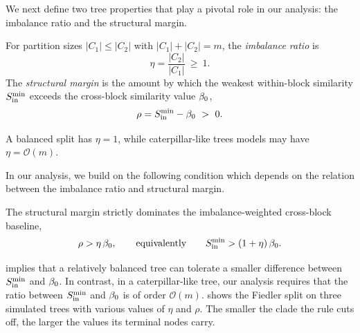 We next define two tree properties that play a pivotal role in our analysis: the imbalance ratio and the structural margin.

\begin{definition}\label{def:imbalance}
For partition sizes $|C_1| \le |C_2|$ with $|C_1|+|C_2|=m$, the \emph{imbalance ratio} is
\begin{equation}\label{eq:imbalance_ratio}
   \eta=\frac{|C_2|}{|C_1|}\ \ge\ 1 .
\end{equation}
The \emph{structural margin} is the
amount by which the weakest within-block similarity $S_{\mathrm{in}}^{\min}$ exceeds the cross-block similarity value $\beta_0$,
\begin{equation}\label{eq:margin_definition}
   \rho = S_{\mathrm{in}}^{\min}-\beta_0 \ >\ 0 .
\end{equation}
\end{definition}

\noindent A balanced split has $\eta=1$, while caterpillar-like trees models may have
$\eta=\mathcal{O}(m)$. 

In our analysis, 
we build on the following condition which depends on the relation between the imbalance ratio and structural margin.

\begin{condition}\label{asm:margin}
The structural margin strictly dominates the imbalance-weighted cross-block baseline,
\begin{equation}\label{eq:margin_assumption}
   \rho>\eta\,\beta_0,\qquad\text{equivalently}\qquad
   S_{\mathrm{in}}^{\min}>(1+\eta)\,\beta_0 .
\end{equation}
\end{condition}

 implies that a relatively balanced tree can tolerate a smaller difference between $S_{\mathrm{in}}^{\min}$ and $\beta_0$. In contrast, in a caterpillar-like tree, our analysis requires that the ratio between $S_{\mathrm{in}}^{\min}$ and $\beta_0$ is of order $\mathcal O(m)$.
 shows the Fiedler split on three simulated trees with various values of $\eta$ and $\rho$. The smaller the clade the rule cuts off, the larger the values its terminal nodes carry.

